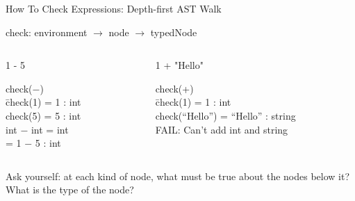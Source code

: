 \documentclass{plt}
\begin{document}
\begin{frame}[fragile]{How To Check Expressions: Depth-first AST Walk}

check: environment $\rightarrow$ node $\rightarrow$ typedNode

\medskip

\begin{columns}
  \begin{column}{0.45\textwidth}
\begin{center}
\begin{C}
1 - 5
\end{C}

\end{center}

\medskip

\begin{tabbing}
check($-$) \\
\hspace{1pc} \=  check(1) = 1 : int \\
\>  check(5) = 5 : int \\
\>  int $-$ int = int \\
\> = 1 $-$ 5 : int
\end{tabbing}
  \end{column}
  \begin{column}{0.45\textwidth}
\begin{center}
\begin{C}
1 + "Hello"
\end{C}

\end{center}

\medskip

\begin{tabbing}
check(+) \\
\hspace{1pc} \= check(1) = 1 : int \\
\>  check(``Hello'') = ``Hello'' : string \\
\>  FAIL: Can't add int and string \\
\end{tabbing}
  \end{column}
\end{columns}

Ask yourself: at each kind of node, what must be true about the nodes
below it?  What is the type of the node?

\end{frame}
\end{document}
